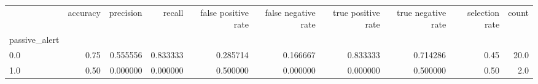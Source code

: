 \begin{tabular}{lrrrrrrrrr}
\toprule
{} &  accuracy &  precision &    recall &  false positive rate &  false negative rate &  true positive rate &  true negative rate &  selection rate &  count \\
passive\_alert &           &            &           &                      &                      &                     &                     &                 &        \\
\midrule
0.0           &      0.75 &   0.555556 &  0.833333 &             0.285714 &             0.166667 &            0.833333 &            0.714286 &            0.45 &   20.0 \\
1.0           &      0.50 &   0.000000 &  0.000000 &             0.500000 &             0.000000 &            0.000000 &            0.500000 &            0.50 &    2.0 \\
\bottomrule
\end{tabular}
